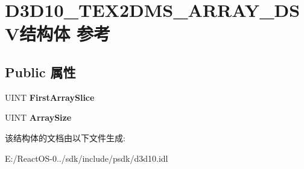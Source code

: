 \hypertarget{struct_d3_d10___t_e_x2_d_m_s___a_r_r_a_y___d_s_v}{}\section{D3\+D10\+\_\+\+T\+E\+X2\+D\+M\+S\+\_\+\+A\+R\+R\+A\+Y\+\_\+\+D\+S\+V结构体 参考}
\label{struct_d3_d10___t_e_x2_d_m_s___a_r_r_a_y___d_s_v}
\subsection*{Public 属性}
\begin{DoxyCompactItemize}
\item 
\mbox{\label{struct_d3_d10___t_e_x2_d_m_s___a_r_r_a_y___d_s_v_aef061651dc8acf0ff3bb59c24bdc14bd}} 
U\+I\+NT {\bfseries First\+Array\+Slice}
\item 
\mbox{\label{struct_d3_d10___t_e_x2_d_m_s___a_r_r_a_y___d_s_v_a945a05f28708487abf04e37c19296c8b}} 
U\+I\+NT {\bfseries Array\+Size}
\end{DoxyCompactItemize}


该结构体的文档由以下文件生成\+:\begin{DoxyCompactItemize}
\item 
E\+:/\+React\+O\+S-\/0../sdk/include/psdk/d3d10.\+idl\end{DoxyCompactItemize}
